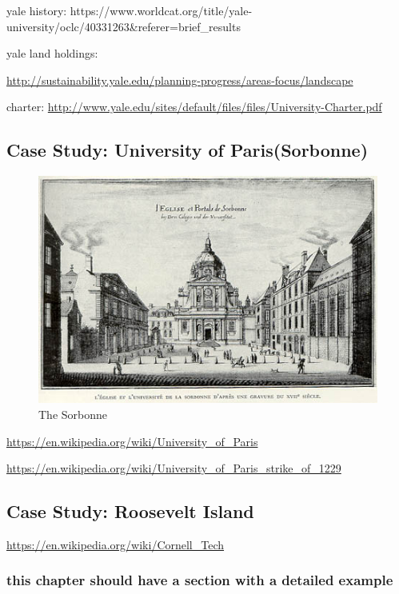 yale history:
https://www.worldcat.org/title/yale-university/oclc/40331263\&referer=brief\_results

yale land holdings:

\url{http://sustainability.yale.edu/planning-progress/areas-focus/landscape}

charter:
\url{http://www.yale.edu/sites/default/files/files/University-Charter.pdf}

\subsection{Case Study: University of
Paris(Sorbonne)}\label{case-study-university-of-parissorbonne}

\begin{figure}[htbp]
\centering
\includegraphics{images/Sorbonne_17thc.jpg}
\caption{The Sorbonne}
\end{figure}

\url{https://en.wikipedia.org/wiki/University_of_Paris}

\url{https://en.wikipedia.org/wiki/University_of_Paris_strike_of_1229}

\subsection{Case Study: Roosevelt
Island}\label{case-study-roosevelt-island}

\url{https://en.wikipedia.org/wiki/Cornell_Tech}

\subsubsection{this chapter should have a section with a detailed
example}\label{this-chapter-should-have-a-section-with-a-detailed-example}

